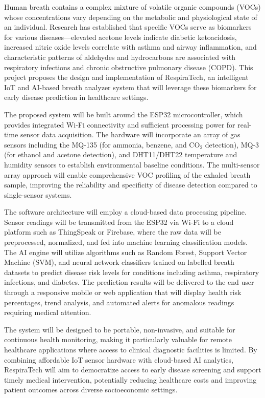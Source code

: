 \documentclass[12pt,a4paper]{report}
\begin{document}
\vspace{0.3cm}
Human breath contains a complex mixture of volatile organic compounds (VOCs) whose concentrations vary depending on the metabolic and physiological state of an individual. Research has established that specific VOCs serve as biomarkers for various diseases---elevated acetone levels indicate diabetic ketoacidosis, increased nitric oxide levels correlate with asthma and airway inflammation, and characteristic patterns of aldehydes and hydrocarbons are associated with respiratory infections and chronic obstructive pulmonary disease (COPD). This project proposes the design and implementation of RespiraTech, an intelligent IoT and AI-based breath analyzer system that will leverage these biomarkers for early disease prediction in healthcare settings.

\vspace{0.3cm}
The proposed system will be built around the ESP32 microcontroller, which provides integrated Wi-Fi connectivity and sufficient processing power for real-time sensor data acquisition. The hardware will incorporate an array of gas sensors including the MQ-135 (for ammonia, benzene, and CO$_2$ detection), MQ-3 (for ethanol and acetone detection), and DHT11/DHT22 temperature and humidity sensors to establish environmental baseline conditions. The multi-sensor array approach will enable comprehensive VOC profiling of the exhaled breath sample, improving the reliability and specificity of disease detection compared to single-sensor systems.

\vspace{0.3cm}
The software architecture will employ a cloud-based data processing pipeline. Sensor readings will be transmitted from the ESP32 via Wi-Fi to a cloud platform such as ThingSpeak or Firebase, where the raw data will be preprocessed, normalized, and fed into machine learning classification models. The AI engine will utilize algorithms such as Random Forest, Support Vector Machine (SVM), and neural network classifiers trained on labelled breath datasets to predict disease risk levels for conditions including asthma, respiratory infections, and diabetes. The prediction results will be delivered to the end user through a responsive mobile or web application that will display health risk percentages, trend analysis, and automated alerts for anomalous readings requiring medical attention.

\vspace{0.3cm}
The system will be designed to be portable, non-invasive, and suitable for continuous health monitoring, making it particularly valuable for remote healthcare applications where access to clinical diagnostic facilities is limited. By combining affordable IoT sensor hardware with cloud-based AI analytics, RespiraTech will aim to democratize access to early disease screening and support timely medical intervention, potentially reducing healthcare costs and improving patient outcomes across diverse socioeconomic settings.
\end{document}
